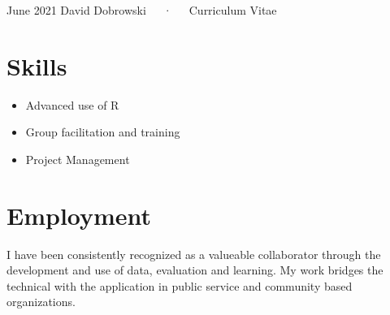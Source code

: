 \documentclass[11pt, a4paper]{awesome-cv}
\providecommand{\tightlist}{%
	\setlength{\itemsep}{0pt}\setlength{\parskip}{0pt}}
\begin{document}
\makecvheader

\makecvfooter
  {June 2021}
    {David Dobrowski~~~·~~~Curriculum Vitae}
  {\thepage}





\hypertarget{skills}{%
\section{Skills}\label{skills}}

\begin{itemize}
\tightlist
\item
  Advanced use of R
\item
  Group facilitation and training
\item
  Project Management
\end{itemize}

\hypertarget{employment}{%
\section{Employment}\label{employment}}

\footnotesize

I have been consistently recognized as a valueable collaborator through
the development and use of data, evaluation and learning. My work
bridges the technical with the application in public service and
community based organizations.
\end{document}
